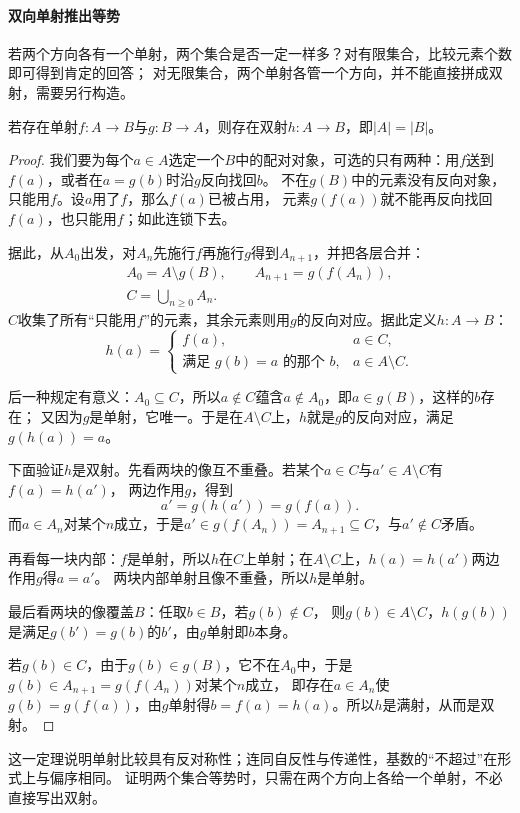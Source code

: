 \paragraph{双向单射推出等势}
若两个方向各有一个单射，两个集合是否一定一样多？对有限集合，比较元素个数即可得到肯定的回答；
对无限集合，两个单射各管一个方向，并不能直接拼成双射，需要另行构造。
\begin{theorem}
\label{thm:comb-cantor-schroeder-bernstein}
若存在单射$f:A\to B$与$g:B\to A$，则存在双射$h:A\to B$，即$|A|=|B|$。
\end{theorem}
\begin{proof}
我们要为每个$a\in A$选定一个$B$中的配对对象，可选的只有两种：用$f$送到$f(a)$，或者在$a=g(b)$时沿$g$反向找回$b$。
不在$g(B)$中的元素没有反向对象，只能用$f$。设$a$用了$f$，那么$f(a)$已被占用，
元素$g(f(a))$就不能再反向找回$f(a)$，也只能用$f$；如此连锁下去。

据此，从$A_0$出发，对$A_n$先施行$f$再施行$g$得到$A_{n+1}$，并把各层合并：
\[
 \begin{gathered}
  A_0=A\setminus g(B),\qquad A_{n+1}=g(f(A_n)),\\
  C=\bigcup_{n\geq0}A_n.
 \end{gathered}
\]
$C$收集了所有“只能用$f$”的元素，其余元素则用$g$的反向对应。据此定义$h:A\to B$：
\[
 h(a)=
 \begin{cases}
  f(a), & a\in C,\\
  \text{满足 }g(b)=a\text{ 的那个 }b, & a\in A\setminus C.
 \end{cases}
\]

后一种规定有意义：$A_0\subseteq C$，所以$a\notin C$蕴含$a\notin A_0$，即$a\in g(B)$，这样的$b$存在；
又因为$g$是单射，它唯一。于是在$A\setminus C$上，$h$就是$g$的反向对应，满足$g(h(a))=a$。

下面验证$h$是双射。先看两块的像互不重叠。若某个$a\in C$与$a'\in A\setminus C$有$f(a)=h(a')$，
两边作用$g$，得到
\[
 a'=g(h(a'))=g(f(a)).
\]
而$a\in A_n$对某个$n$成立，于是$a'\in g(f(A_n))=A_{n+1}\subseteq C$，与$a'\notin C$矛盾。

再看每一块内部：$f$是单射，所以$h$在$C$上单射；在$A\setminus C$上，$h(a)=h(a')$两边作用$g$得$a=a'$。
两块内部单射且像不重叠，所以$h$是单射。

最后看两块的像覆盖$B$：任取$b\in B$，若$g(b)\notin C$，
则$g(b)\in A\setminus C$，$h(g(b))$是满足$g(b')=g(b)$的$b'$，由$g$单射即$b$本身。

若$g(b)\in C$，由于$g(b)\in g(B)$，它不在$A_0$中，于是$g(b)\in A_{n+1}=g(f(A_n))$对某个$n$成立，
即存在$a\in A_n$使$g(b)=g(f(a))$，由$g$单射得$b=f(a)=h(a)$。所以$h$是满射，从而是双射。
\end{proof}
这一定理说明单射比较具有反对称性；连同自反性与传递性，基数的“不超过”在形式上与偏序相同。
证明两个集合等势时，只需在两个方向上各给一个单射，不必直接写出双射。

